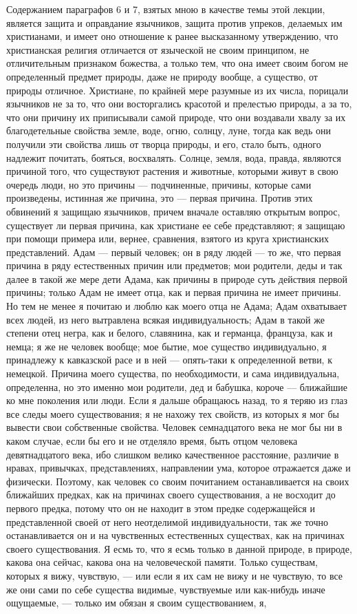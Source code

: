 \documentclass[12pt]{article}
\begin{document}
Содержанием параграфов 6 и 7, взятых мною в качестве темы этой лекции, является защита и оправдание язычников, защита против упреков, делаемых им христианами, и имеет оно отношение к ранее высказанному утверждению, что христианская религия отличается от языческой не своим принципом, не отличительным признаком божества, а только тем, что она имеет своим богом не определенный предмет природы, даже не природу вообще, а существо, от природы отличное. Христиане, по крайней мере разумные из их числа, порицали язычников не за то, что они восторгались красотой и прелестью природы, а за то, что они причину их приписывали самой природе, что они воздавали хвалу за их благодетельные свойства земле, воде, огню, солнцу, луне, тогда как ведь они получили эти свойства лишь от творца природы, и его, стало быть, одного надлежит почитать, бояться, восхвалять. Солнце, земля, вода, правда, являются причиной того, что существуют растения и животные, которыми живут в свою очередь люди, но это причины --- подчиненные, причины, которые сами произведены, истинная же причина, это --- первая причина. Против этих обвинений я защищаю язычников, причем вначале оставляю открытым вопрос, существует ли первая причина, как христиане ее себе представляют; я защищаю при помощи примера или, вернее, сравнения, взятого из круга христианских представлений. Адам --- первый человек; он в ряду людей --- то же, что первая причина в ряду естественных причин или предметов; мои родители, деды и так далее в такой же мере дети Адама, как причины в природе суть действия первой причины; только Адам не имеет отца, как и первая причина не имеет причины. Но тем не менее я почитаю и люблю как моего отца не Адама; Адам охватывает всех людей, из него вытравлена всякая индивидуальность; Адам в такой же степени отец негра, как и белого, славянина, как и германца, француза, как и немца; я же не человек вообще; мое бытие, мое существо индивидуально, я принадлежу к кавказской расе и в ней --- опять-таки к определенной ветви, к немецкой. Причина моего существа, по необходимости, и сама индивидуальна, определенна, но это именно мои родители, дед и бабушка, короче --- ближайшие ко мне поколения или люди. Если я дальше обращаюсь назад, то я теряю из глаз все следы моего существования; я не нахожу тех свойств, из которых я мог бы вывести свои собственные свойства. Человек семнадцатого века не мог бы ни в каком случае, если бы его и не отделяло время, быть отцом человека девятнадцатого века, ибо слишком велико качественное расстояние, различие в нравах, привычках, представлениях, направлении ума, которое отражается даже и физически. Поэтому, как человек со своим почитанием останавливается на своих ближайших предках, как на причинах своего существования, а не восходит до первого предка, потому что он не находит в этом предке содержащейся и представленной своей от него неотделимой индивидуальности, так же точно останавливается он и на чувственных естественных существах, как на причинах своего существования. Я есмь то, что я есмь только в данной природе, в природе, какова она сейчас, какова она на человеческой памяти. Только существам, которых я вижу, чувствую, --- или если я их сам не вижу и не чувствую, то все же они сами по себе существа видимые, чувствуемые или как-нибудь иначе ощущаемые, --- только им обязан я своим существованием, я, 
\end{document}
